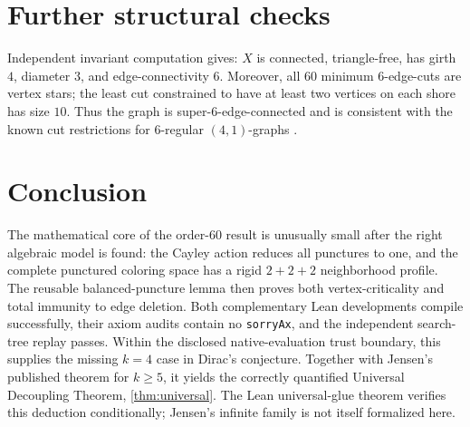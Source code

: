 \documentclass[10pt]{amsart}
\theoremstyle{definition}
\begin{document}
\section{Further structural checks}

Independent invariant computation gives: $X$ is connected, triangle-free,
has girth $4$, diameter $3$, and edge-connectivity $6$.  Moreover, all
$60$ minimum $6$-edge-cuts are vertex stars; the least cut constrained to have
at least two vertices on each shore has size $10$.  Thus the graph is
super-$6$-edge-connected and is consistent with the known cut restrictions
for $6$-regular $(4,1)$-graphs \cite{Ferudun2026}.

\section{Conclusion}

The mathematical core of the order-$60$ result is unusually small after the
right algebraic model is found: the Cayley action reduces all punctures to one,
and the complete punctured coloring space has a rigid $2+2+2$ neighborhood
profile.  The reusable balanced-puncture lemma then proves both
vertex-criticality and total immunity to edge deletion. Both complementary
Lean developments compile successfully, their axiom audits contain no
\texttt{sorryAx}, and the independent search-tree replay passes. Within the
disclosed native-evaluation trust boundary, this supplies the missing $k=4$
case in Dirac's conjecture. Together with Jensen's published theorem for
$k\geq5$, it yields the correctly quantified Universal Decoupling Theorem,
\cref{thm:universal}. The Lean universal-glue theorem verifies this deduction
conditionally; Jensen's infinite family is not itself formalized here.
\end{document}
